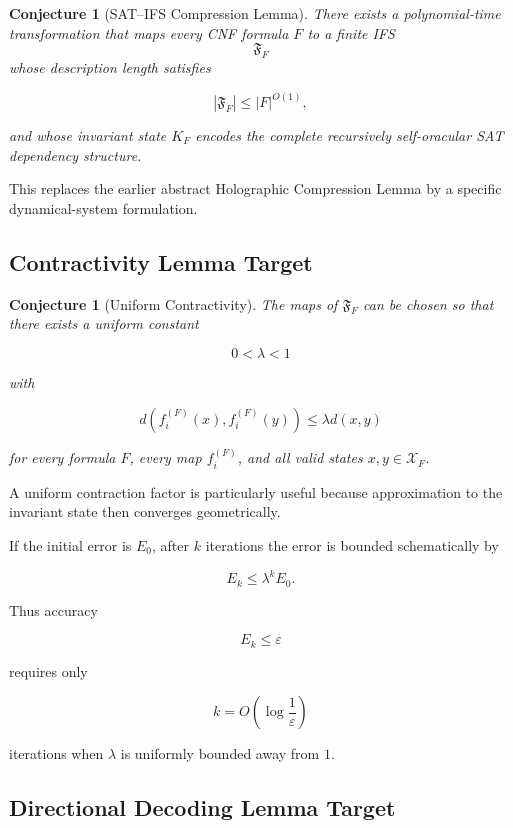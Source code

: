 \documentclass[11pt]{article}
\theoremstyle{plain}
\newtheorem{conjecture}[theorem]{Conjecture}
\theoremstyle{definition}
\begin{document}
\begin{conjecture}[SAT--IFS Compression Lemma]
\label{conj:sat-ifs-compression}
There exists a polynomial-time transformation that maps every CNF formula
\(F\) to a finite IFS
\[
    \mathfrak{F}_F
\]
whose description length satisfies

\[
    |\mathfrak{F}_F|
    \leq
    |F|^{O(1)},
\]

and whose invariant state \(K_F\) encodes the complete recursively
self-oracular SAT dependency structure.
\end{conjecture}

This replaces the earlier abstract Holographic Compression Lemma by a specific
dynamical-system formulation.

\subsection{Contractivity Lemma Target}

\begin{conjecture}[Uniform Contractivity]
\label{conj:uniform-contractivity}
The maps of \(\mathfrak{F}_F\) can be chosen so that there exists a uniform
constant

\[
    0<\lambda<1
\]

with

\[
    d(f_i^{(F)}(x),f_i^{(F)}(y))
    \leq
    \lambda d(x,y)
\]

for every formula \(F\), every map \(f_i^{(F)}\), and all valid states
\(x,y\in\mathcal{X}_F\).
\end{conjecture}

A uniform contraction factor is particularly useful because approximation to
the invariant state then converges geometrically.

If the initial error is \(E_0\), after \(k\) iterations the error is bounded
schematically by

\[
    E_k
    \leq
    \lambda^k E_0.
\]

Thus accuracy

\[
    E_k\leq\varepsilon
\]

requires only

\[
    k
    =
    O\!\left(
        \log\frac{1}{\varepsilon}
    \right)
\]

iterations when \(\lambda\) is uniformly bounded away from \(1\).

\subsection{Directional Decoding Lemma Target}
\end{document}
